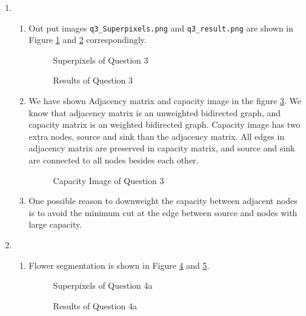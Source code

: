 \documentclass[12pt]{article}
\begin{document}
\begin{enumerate}
	


	\item
	\begin{enumerate}
		\item 
		 Out put images  \texttt{q3\_Superpixels.png} and \texttt{q3\_result.png} are shown in Figure \ref{fig:q3_1} and \ref{fig:q3_2} correspondingly.
		\begin{figure}[H]
			\centering{}
			\caption{Superpixels of Question 3}
			\label{fig:q3_1}
		\end{figure}
		\begin{figure}[H]
			\centering{}
			\caption{Results of Question 3}
			\label{fig:q3_2}
		\end{figure}
	
	\item We have shown Adjacency matrix and capacity image in the figure \ref{fig:q3_3}. We know that adjacency matrix is an unweighted bidirected graph, and capacity matrix is an weighted bidirected graph. Capacity image has two extra nodes, source and sink than the adjacency matrix. All edges in adjacency matrix are preserved in capacity matrix, and source and sink are connected to all nodes besides each other.
	\begin{figure}[H]
		\centering{}
		\caption{Capacity Image of Question 3}
		\label{fig:q3_3}
	\end{figure}

	\item One possible reason to downweight the capacity between adjacent nodes is to avoid the minimum cut at the edge between source and nodes with large capacity. 
	\end{enumerate}

	\item \begin{enumerate}
		\item Flower segmentation is shown in Figure \ref{fig:q4_1_1} and \ref{fig:q4_1_2}.
		\begin{figure}[H]
			\centering{}
			\caption{Superpixels of Question 4a}
			\label{fig:q4_1_1}
		\end{figure}
		\begin{figure}[H]
			\centering{}
			\caption{Results of Question 4a}
			\label{fig:q4_1_2}
		\end{figure}
	

\end{enumerate}
\end{enumerate}
\end{document}
